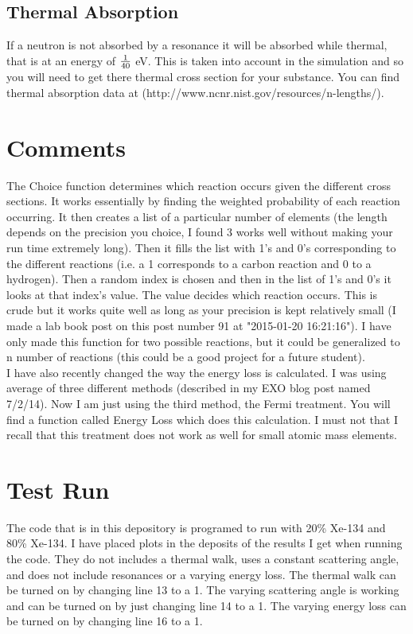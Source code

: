 \documentclass[12pt]{amsart}
\begin{document}
\subsection{Thermal Absorption}
If a neutron is not absorbed by a resonance it will be absorbed while thermal, that is at an energy of $1\over{40}$ eV. This is taken into account in the simulation and so you will need to get there thermal cross section for your substance. You can find thermal absorption data at (http://www.ncnr.nist.gov/resources/n-lengths/).
\section{Comments}
The Choice function determines which reaction occurs given the different cross sections. It works essentially by finding the weighted probability of each reaction occurring. It then creates a list of a particular number of elements (the length depends on the precision you choice, I found 3 works well without making your run time extremely long). Then it fills the list with 1's and 0's corresponding to the different reactions (i.e. a 1 corresponds to a carbon reaction and 0 to a hydrogen). Then a random index is chosen and then in the list of 1's and 0's it looks at that index's value. The value decides which reaction occurs. This is crude but it works quite well as long as your precision is kept relatively small (I made a lab book post on this post number 91 at "2015-01-20 16:21:16"). I have only made this function for two possible reactions, but it could be generalized to n number of reactions (this could be a good project for a future student).\\
\indent I have also recently changed the way the energy loss is calculated. I was using average of three different methods (described in my EXO blog post named 7/2/14). Now I am just using the third method, the Fermi treatment. You will find a function called Energy Loss which does this calculation. I must not that I recall that this treatment does not work as well for small atomic mass elements.
\section{Test Run}
The code that is in this depository is programed to run with 20\% Xe-134 and 80\% Xe-134. I have placed plots in the deposits of the results I get when running the code. They do not includes a thermal walk, uses a constant scattering angle, and does not include resonances or a varying energy loss. The thermal walk can be turned on by changing line 13 to a 1. The varying scattering angle is working and can be turned on by just changing line 14 to a 1. The varying energy loss can be turned on by changing line 16 to a 1. \\
\end{document}
